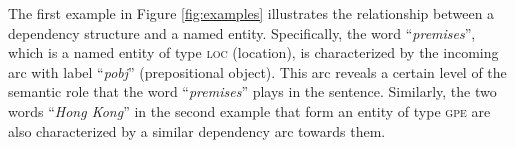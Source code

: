 The first example in Figure \ref{fig:examples} illustrates the relationship between a dependency structure and a named entity. 
Specifically, the word ``{\it premises}'', which is a named entity of type \textsc{loc} (location), is characterized by the incoming arc with label ``{\it pobj}'' (prepositional object). 
This arc reveals a certain level of the semantic role that the word ``{\it premises}'' plays in the sentence. 
Similarly, the two words ``{\it Hong Kong}'' in the second example that form an entity of type \textsc{gpe} are also characterized by a similar dependency arc towards them.



